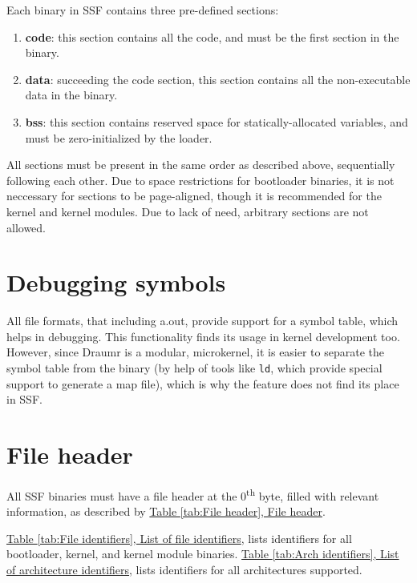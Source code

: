 \documentclass[a4paper,oneside]{memoir}
\begin{document}
Each binary in SSF contains three pre-defined sections:

\begin{enumerate}
\item \textbf{code}: this section contains all the code, and must be the first section in the binary.
\item \textbf{data}: succeeding the code section, this section contains all the non-executable data in the binary.
\item \textbf{bss}: this section contains reserved space for statically-allocated variables, and must be zero-initialized by the loader. 
\end{enumerate}

All sections must be present in the same order as described above, sequentially following each other. Due to space restrictions for bootloader binaries, it is not neccessary for sections to be page-aligned, though it is recommended for the kernel and kernel modules. Due to lack of need, arbitrary sections are not allowed.

\section{Debugging symbols}

All file formats, that including a.out, provide support for a symbol table, which helps in debugging. This functionality finds its usage in kernel development too. However, since Draumr is a modular, microkernel, it is easier to separate the symbol table from the binary (by help of tools like \texttt{ld}, which provide special support to generate a map file), which is why the feature does not find its place in SSF.

\section{File header}

All SSF binaries must have a file header at the 0\textsuperscript{th} byte, filled with relevant information, as described by \hyperref[tab:File header]{Table \ref*{tab:File header}, File header}.

\hyperref[tab:File identifiers]{Table \ref*{tab:File identifiers}, List of file identifiers}, lists identifiers for all bootloader, kernel, and kernel module binaries. \hyperref[tab:Arch identifiers]{Table \ref*{tab:Arch identifiers}, List of architecture identifiers}, lists identifiers for all architectures supported.
\end{document}
